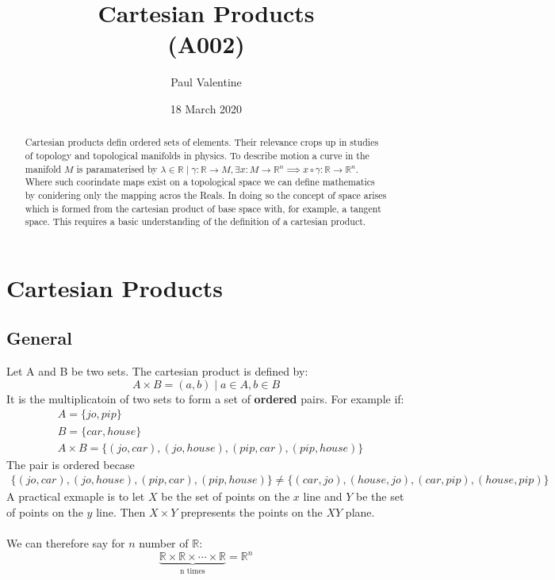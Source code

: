 \documentclass[a4paper]{article}
\title{\textbf{Cartesian Products}\\(A002)}
\author{Paul Valentine}
\date{18 March 2020}
\begin{document}
\maketitle
\begin{abstract}
  Cartesian products defin ordered sets of elements. Their relevance crops up in studies of topology and topological manifolds in physics. To describe motion a curve in the manifold $M$ is paramaterised by $\lambda \in \mathbb{R} \mid \gamma : \mathbb{R} \to M , \exists x:M \to \mathbb{R}^n \implies x \circ \gamma : \mathbb{R} \to \mathbb{R}^n$. Where such coorindate maps exist on a topological space we can define mathematics by conidering only the mapping acros the Reals. In doing so the concept of space arises which is formed from the cartesian product of base space with, for example, a tangent space. This requires a basic understanding of the definition of a cartesian product.
\end{abstract}
\section{Cartesian Products}
\subsection{General}
Let A and B be two sets. The cartesian product is defined by:
\begin{equation}
A \times B = {(a,b)\mid a\in A, b\in B}
\end{equation}
It is the multiplicatoin of two sets to form a set of \textbf{ordered} pairs. For example if:
\begin{align*}
&A=\{ jo, pip \}\\
&B = \{car, house\}\\
&A\times B = \{(jo,car),(jo,house),(pip,car),(pip,house)\}
\end{align*}
The pair is ordered becase
\begin{align*}
  \{(jo,car),(jo,house),(pip,car),(pip,house)\} \neq \{(car,jo),(house,jo),(car,pip),(house,pip)\}
\end{align*}
A practical exmaple is to let $X$ be the set of points on the $x$ line and $Y$ be the set of points on the $y$ line. Then $X \times Y$ prepresents the points on the $XY$ plane.\\ \\
We can therefore say for $n$ number of $\mathbb{R}$:
\begin{equation}
\underbrace{\mathbb{R} \times \mathbb{R} \times \cdots \times \mathbb{R}}_{\text{n times}}=\mathbb{R}^n
\end{equation}
\end{document}
